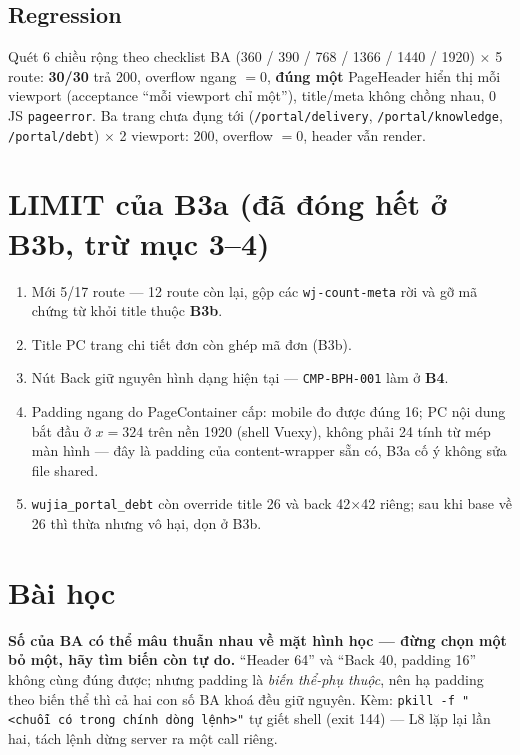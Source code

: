 \subsection{Regression}

Quét 6 chiều rộng theo checklist BA (360 / 390 / 768 / 1366 / 1440 / 1920) $\times$ 5 route:
\textbf{30/30} trả 200, overflow ngang $=0$, \textbf{đúng một} PageHeader hiển thị mỗi
viewport (acceptance ``mỗi viewport chỉ một''), title/meta không chồng nhau, 0 JS
\texttt{pageerror}. Ba trang chưa đụng tới (\texttt{/portal/delivery},
\texttt{/portal/knowledge}, \texttt{/portal/debt}) $\times$ 2 viewport: 200, overflow $=0$,
header vẫn render.

\section{LIMIT của B3a (đã đóng hết ở B3b, trừ mục 3--4)}

\begin{enumerate}
\item Mới 5/17 route --- 12 route còn lại, gộp các \texttt{wj-count-meta} rời và gỡ mã chứng
  từ khỏi title thuộc \textbf{B3b}.
\item Title PC trang chi tiết đơn còn ghép mã đơn (B3b).
\item Nút Back giữ nguyên hình dạng hiện tại --- \texttt{CMP-BPH-001} làm ở \textbf{B4}.
\item Padding ngang do PageContainer cấp: mobile đo được đúng 16; PC nội dung bắt đầu ở
  $x=324$ trên nền 1920 (shell Vuexy), không phải 24 tính từ mép màn hình --- đây là padding
  của content-wrapper sẵn có, B3a cố ý không sửa file shared.
\item \texttt{wujia\_portal\_debt} còn override title 26 và back 42$\times$42 riêng; sau khi
  base về 26 thì thừa nhưng vô hại, dọn ở B3b.
\end{enumerate}

\section{Bài học}

\textbf{Số của BA có thể mâu thuẫn nhau về mặt hình học --- đừng chọn một bỏ một, hãy tìm biến
còn tự do.} ``Header 64'' và ``Back 40, padding 16'' không cùng đúng được; nhưng padding là
\emph{biến thể-phụ thuộc}, nên hạ padding theo biến thể thì cả hai con số BA khoá đều giữ
nguyên. Kèm: \texttt{pkill -f "<chuỗi có trong chính dòng lệnh>"} tự giết shell (exit 144) ---
L8 lặp lại lần hai, tách lệnh dừng server ra một call riêng.


